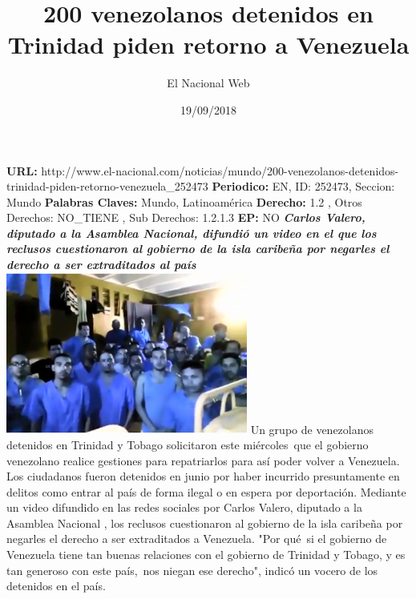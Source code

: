 \documentclass{article}%
\title{\textbf{200 venezolanos detenidos en Trinidad piden retorno a Venezuela}}%
\author{El Nacional Web}%
\date{19/09/2018}%
\begin{document}
%
\normalsize%
\maketitle%
\textbf{URL: }%
http://www.el{-}nacional.com/noticias/mundo/200{-}venezolanos{-}detenidos{-}trinidad{-}piden{-}retorno{-}venezuela\_252473\newline%
%
\textbf{Periodico: }%
EN, %
ID: %
252473, %
Seccion: %
Mundo\newline%
%
\textbf{Palabras Claves: }%
Mundo, Latinoamérica\newline%
%
\textbf{Derecho: }%
1.2%
, Otros Derechos: %
NO\_TIENE%
, Sub Derechos: %
1.2.1.3%
\newline%
%
\textbf{EP: }%
NO\newline%
\newline%
%
\textbf{\textit{Carlos Valero, diputado a la Asamblea Nacional, difundió un video en el que los reclusos cuestionaron al gobierno de la isla caribeña por negarles el derecho a ser extraditados al país}}%
\newline%
\newline%
%
\includegraphics[width=300px]{188.jpg}%
\newline%
%
Un grupo de venezolanos detenidos en Trinidad y Tobago solicitaron este miércoles~que el gobierno venezolano realice gestiones para repatriarlos para así poder volver a Venezuela.%
\newline%
%
Los ciudadanos fueron detenidos en junio por haber incurrido presuntamente en delitos como entrar al país de forma ilegal o en espera por deportación.%
\newline%
%
Mediante un video difundido en las redes sociales por Carlos Valero, diputado a la Asamblea Nacional , los reclusos cuestionaron al gobierno de la isla caribeña por negarles el derecho a ser extraditados a Venezuela.%
\newline%
%
"Por qué~si el gobierno de Venezuela tiene tan buenas relaciones con el gobierno de Trinidad y Tobago, y es tan generoso con este país,~nos niegan ese derecho", indicó un vocero de los detenidos en el país.%
\end{document}
